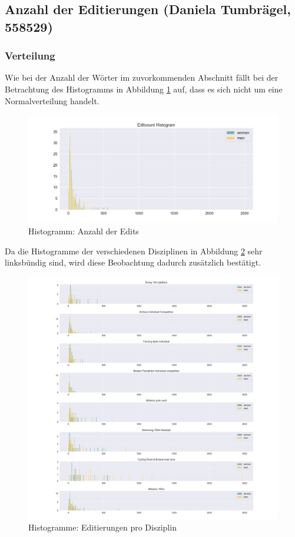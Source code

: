 \documentclass[11pt]{article}
\begin{document}
\subsection{Anzahl der Editierungen (Daniela Tumbrägel, 558529)}
\subsubsection{Verteilung}
Wie bei der Anzahl der Wörter im zuvorkommenden Abschnitt fällt bei der Betrachtung des Histogramms in Abbildung \ref{fig:editcountHistogram} auf, dass es sich nicht um eine Normalverteilung handelt.

\begin{figure}
\includegraphics[width=1\textwidth]{figures/editcount_small_bins_histogram.png}
\caption[Histogramm: Anzahl der Edits]{Histogramm: Anzahl der Edits}
\label{fig:editcountHistogram}
\end{figure}

Da die Histogramme der verschiedenen Disziplinen in Abbildung \ref{fig:editcountDisciplineHistogram} sehr linksbündig sind, wird diese Beobachtung dadurch zusätzlich bestätigt. 

\begin{figure}
\includegraphics[width=1\textwidth]{figures/editcount_disciplines_histogram.png}
\caption[Histogramme: Editierungen pro Disziplin]{Histogramme: Editierungen pro Disziplin}
\label{fig:editcountDisciplineHistogram}
\end{figure}
\end{document}
